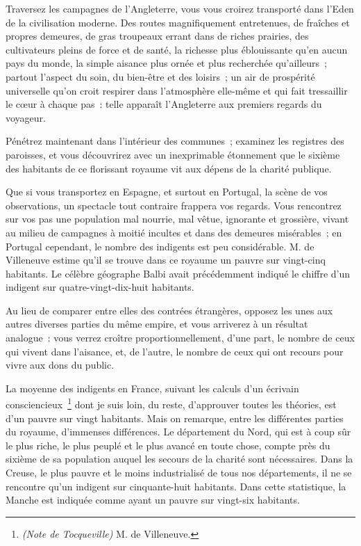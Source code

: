\documentclass[french,twoside]{book} %
\begin{document}
\noindent Traversez les campagnes de l’Angleterre, vous vous croirez transporté dans l’Eden de la civilisation moderne. Des routes magnifiquement entretenues, de fraîches et propres demeures, de gras troupeaux errant dans de riches prairies, des cultivateurs pleins de force et de santé, la richesse plus éblouissante qu’en aucun pays du monde, la simple aisance plus ornée et plus recherchée qu’ailleurs ; partout l’aspect du soin, du bien-être et des loisirs ; un air de prospérité universelle qu’on croit respirer dans l’atmosphère elle-même et qui fait tressaillir le cœur à chaque pas : telle apparaît l’Angleterre aux premiers regards du voyageur.\par
Pénétrez maintenant dans l’intérieur des communes ; examinez les registres des paroisses, et vous découvrirez avec un inexprimable étonnement que le sixième des habitants de ce florissant royaume vit aux dépens de la charité publique.\par
Que si vous transportez en Espagne, et surtout en Portugal, la scène de vos observations, un spectacle tout contraire frappera vos regards. Vous rencontrez sur vos pas une population mal nourrie, mal vêtue, ignorante et grossière, vivant au milieu de campagnes à moitié incultes et dans des demeures misérables ; en Portugal cependant, le nombre des indigents est peu considérable. M. de Villeneuve estime qu’il se trouve dans ce royaume un pauvre sur vingt-cinq habitants. Le célèbre géographe Balbi avait précédemment indiqué le chiffre d’un indigent sur quatre-vingt-dix-huit habitants.\par
\bigbreak
\noindent Au lieu de comparer entre elles des contrées étrangères, opposez les unes aux autres diverses parties du même empire, et vous arriverez à un résultat analogue : vous verrez croître proportionnellement, d’une part, le nombre de ceux qui vivent dans l’aisance, et, de l’autre, le nombre de ceux qui ont recours pour vivre aux dons du public.\par
La moyenne des indigents en France, suivant les calculs d’un écrivain consciencieux \footnote{\emph{(Note de Tocqueville)} M. de Villeneuve.} dont je suis loin, du reste, d’approuver toutes les théories, est d’un pauvre sur vingt habitants. Mais on remarque, entre les différentes parties du royaume, d’immenses différences. Le département du Nord, qui est à coup sûr le plus riche, le plus peuplé et le plus avancé en toute chose, compte près du sixième de sa population auquel les secours de la charité sont nécessaires. Dans la Creuse, le plus pauvre et le moins industrialisé de tous nos départements, il ne se rencontre qu’un indigent sur cinquante-huit habitants. Dans cette statistique, la Manche est indiquée comme ayant un pauvre sur vingt-six habitants.\par
\end{document}
